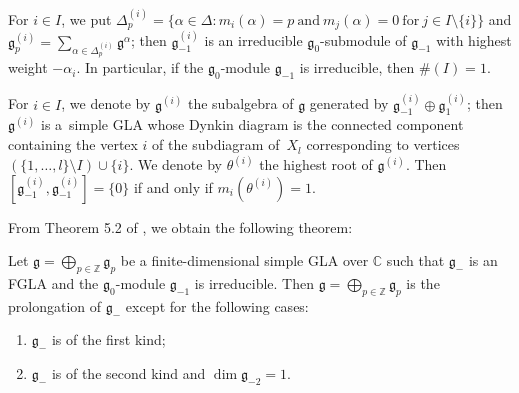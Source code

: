 \documentclass[pdftex]{sigma}
\numberwithin{equation}{section}
\numberwithin{theorem}{section}
\numberwithin{proposition}{section}
\numberwithin{lemma}{section}
\numberwithin{corollary}{section}
\numberwithin{definition}{section}
\numberwithin{example}{section}
\numberwithin{remark}{section}
\numberwithin{note}{section}
\newcommand{\gla}[1]{\mathfrak#1=\bigoplus\limits_{p\in\mathbb Z}\mathfrak#1_p} \renewcommand{\labelenumi}{{\rm (\arabic{enumi})}}
\begin{document}
For $i\in I$, we put $\Delta_p^{(i)}=\{\alpha\in\Delta:
m_i(\alpha)=p\ \text{and}\ m_j(\alpha)=
0\ \text{for}\ j\in I\setminus\{i\} \}$ and
$\mathfrak g_p^{(i)}=\sum\limits_{\alpha\in\Delta_p^{(i)}}\mathfrak g^\alpha$;
then
$\mathfrak g_{-1}^{(i)}$ is an irreducible
$\mathfrak g_0$-submodule of $\mathfrak g_{-1}$ with
highest weight $-\alpha_i$.
In particular, if the $\mathfrak g_0$-module $\mathfrak g_{-1}$
is irreducible, then $\#(I)=1$.

{\samepage For $i\in I$,
we denote by $\mathfrak g^{(i)}$ the subalgebra of $\mathfrak g$ generated by
$\mathfrak g_{-1}^{(i)}\oplus \mathfrak g_{1}^{(i)}$;
then $\mathfrak g^{(i)}$ is a~simple GLA whose
Dynkin diagram is the connected component containing the vertex $i$ of
the sub\-diagram of~$X_l$
corresponding to vertices $(\{1,\dots,l\}\setminus I)\cup\{i\}$.
We denote by $\theta^{(i)}$ the highest root of $\mathfrak g^{(i)}$.
Then $[\mathfrak g_{-1}^{(i)},\mathfrak g_{-1}^{(i)}]=\{0\}$ if and only if
$m_i(\theta^{(i)})=1$.

}

From Theorem 5.2 of \cite{yam93:1}, we obtain the following theorem:
\begin{theorem}\label{thm5.1}
Let $\gla g$ be a finite-dimensional simple GLA over $\mathbb C$ such that
$\mathfrak g_-$ is an FGLA and
the $\mathfrak g_0$-module $\mathfrak g_{-1}$
is irreducible.
Then $\gla g$ is the prolongation of $\mathfrak g_-$ except for
the following cases:
\begin{enumerate}\itemsep=0pt
\renewcommand{\labelenumi}{$(\alph{enumi})$}
\item $\mathfrak g_-$ is of the first kind;
\item $\mathfrak g_-$ is of the second kind and $\dim\mathfrak g_{-2}=1$.
\end{enumerate}
\end{theorem}
\end{document}
